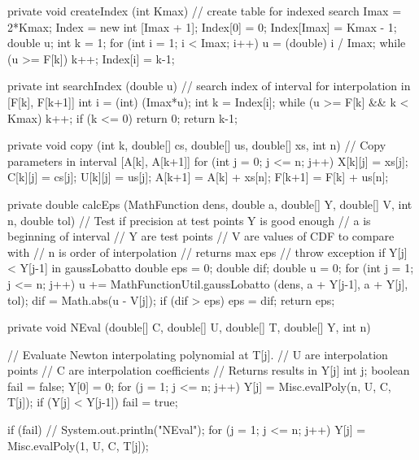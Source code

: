 \begin{hide}\begin{code}

   private void createIndex (int Kmax) {
      // create table for indexed search
      Imax = 2*Kmax;
      Index = new int [Imax + 1];
      Index[0] = 0;
      Index[Imax] = Kmax - 1;
      double u;
      int k = 1;
      for (int i = 1; i < Imax; i++) {
         u = (double) i / Imax;
         while (u >= F[k])
            k++;
         Index[i] = k-1;
      }
   }


   private int searchIndex (double u) {
      // search index of interval for interpolation in [F[k], F[k+1]]
      int i = (int) (Imax*u);
      int k = Index[i];
      while (u >= F[k]  && k < Kmax)
         k++;
      if (k <= 0)
         return 0;
      return k-1;
   }


   private void copy (int k, double[] cs, double[] us, double[] xs, int n) {
      // Copy parameters in interval [A[k], A[k+1]]
      for (int j = 0; j <= n; j++) {
         X[k][j] = xs[j];
         C[k][j] = cs[j];
         U[k][j] = us[j];
      }
      A[k+1] = A[k] + xs[n];
      F[k+1] = F[k] + us[n];
   }


   private double calcEps (MathFunction dens, double a, double[] Y,
                           double[] V, int n, double tol) {
      // Test if precision at test points Y is good enough
      // a is beginning of interval
      // Y are test points
      // V are values of CDF to compare with
      // n is order of interpolation
      // returns max eps
      // throw exception if Y[j] < Y[j-1] in gaussLobatto
      double eps = 0;
      double dif;
      double u = 0;
      for (int j = 1; j <= n; j++) {
         u += MathFunctionUtil.gaussLobatto (dens, a + Y[j-1], a + Y[j], tol);
         dif = Math.abs(u - V[j]);
         if (dif > eps)
            eps = dif;
      }
      return eps;
   }


   private void NEval (double[] C, double[] U, double[] T, double[] Y, int n) {
      // Evaluate Newton interpolating polynomial at T[j].
      // U are interpolation points
      // C are interpolation coefficients
      // Returns results in Y[j]
      int j;
      boolean fail = false;
      Y[0] = 0;
      for (j = 1; j <= n; j++) {
         Y[j] = Misc.evalPoly(n, U, C, T[j]);
         if (Y[j] < Y[j-1])
            fail = true;
      }

      if (fail) {
//       System.out.println("NEval");
         for (j = 1; j <= n; j++)
            Y[j] = Misc.evalPoly(1, U, C, T[j]);
      }
   }



\end{code}
\end{hide}
